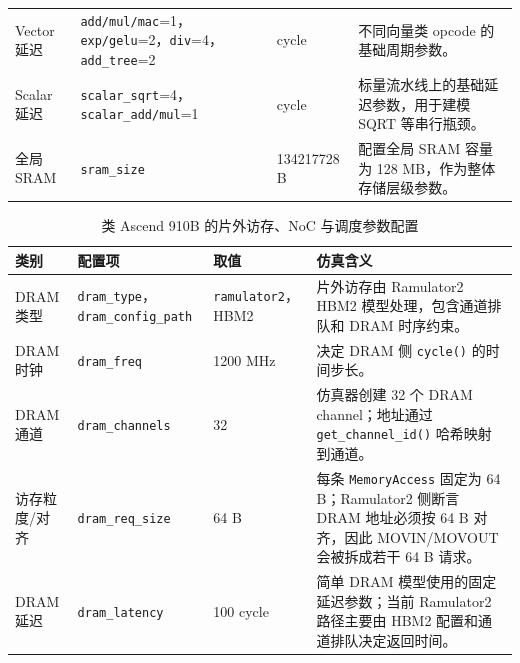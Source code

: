 \documentclass{CjC}
\begin{document}
\begin{table}[H]
\begin{tabular}{p{2.4cm} p{3.2cm} p{2.3cm} p{5.4cm}}
            Vector 延迟 & \texttt{add/mul/mac}=1，\texttt{exp/gelu}=2，\texttt{div}=4，\texttt{add\_tree}=2 & cycle &
            不同向量类 opcode 的基础周期参数。 \\

            Scalar 延迟 & \texttt{scalar\_sqrt}=4，\texttt{scalar\_add/mul}=1 & cycle &
            标量流水线上的基础延迟参数，用于建模 SQRT 等串行瓶颈。 \\

            全局 SRAM & \texttt{sram\_size} & 134217728 B &
            配置全局 SRAM 容量为 128 MB，作为整体存储层级参数。 \\
            \bottomrule
        \end{tabular}
    \end{table}

    \begin{table}[H]
        \centering
        \caption{类 Ascend 910B 的片外访存、NoC 与调度参数配置}
        \label{tab:ascend910b-memory-config}
        \footnotesize
        \setlength{\tabcolsep}{3pt}
        \renewcommand{\arraystretch}{1.12}
        \begin{tabular}{p{2.4cm} p{3.2cm} p{2.3cm} p{5.4cm}}
            \toprule
            \textbf{类别} & \textbf{配置项} & \textbf{取值} & \textbf{仿真含义} \\
            \midrule
            DRAM 类型 & \texttt{dram\_type}，\texttt{dram\_config\_path} & \texttt{ramulator2}，HBM2 &
            片外访存由 Ramulator2 HBM2 模型处理，包含通道排队和 DRAM 时序约束。 \\

            DRAM 时钟 & \texttt{dram\_freq} & 1200 MHz &
            决定 DRAM 侧 \texttt{cycle()} 的时间步长。 \\

            DRAM 通道 & \texttt{dram\_channels} & 32 &
            仿真器创建 32 个 DRAM channel；地址通过 \texttt{get\_channel\_id()} 哈希映射到通道。 \\

            访存粒度/对齐 & \texttt{dram\_req\_size} & 64 B &
            每条 \texttt{MemoryAccess} 固定为 64 B；Ramulator2 侧断言 DRAM 地址必须按 64 B 对齐，因此 MOVIN/MOVOUT 会被拆成若干 64 B 请求。 \\

            DRAM 延迟 & \texttt{dram\_latency} & 100 cycle &
            简单 DRAM 模型使用的固定延迟参数；当前 Ramulator2 路径主要由 HBM2 配置和通道排队决定返回时间。 \\


\end{tabular}
\end{table}
\end{document}
